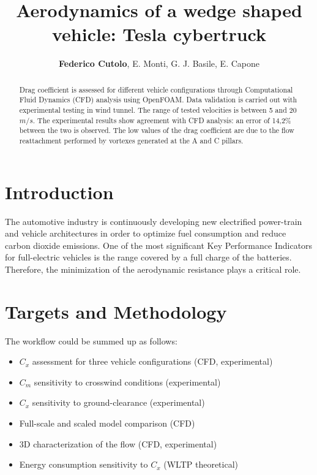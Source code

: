 \documentclass{elbioimp2}
\title{Aerodynamics of a wedge shaped vehicle: Tesla cybertruck}
\author{\textbf{Federico Cutolo}\affiliation{Department of Aerospace Science and Technology, Politecnico di Milano, Milano, Italy}, E. Monti, G. J. Basile, E. Capone\affiliation{Department of Mechanics, Politecnico di Milano, Milano, Italy}}
\begin{document}
\maketitle
\begin{abstract}
  Drag coefficient is assessed for different vehicle configurations through Computational Fluid Dynamics (CFD) analysis using OpenFOAM\textsupercript\textregistered. Data validation is carried out with experimental testing in wind tunnel. The  range of tested velocities is between 5 and 20 $m/s$. The experimental results show agreement with CFD analysis: an error of 14,2\% between the two is observed. The low values of the drag coefficient are due to the flow reattachment performed by vortexes generated at the A and C pillars.
\end{abstract}
\section{Introduction}
The automotive industry is continuously developing new electrified power-train and vehicle architectures in order to optimize fuel consumption and reduce carbon dioxide emissions.
One of the most significant Key Performance Indicators for full-electric vehicles is the range covered by a full charge of the batteries. Therefore, the minimization of the aerodynamic resistance plays a critical role. 

\section{Targets and Methodology}
The workflow could be summed up as follows:
\begin{itemize}
    \item $C_x$ assessment for three vehicle configurations (CFD, experimental)
    \item $C_m$ sensitivity to crosswind conditions (experimental)
    \item $C_x$ sensitivity to ground-clearance (experimental)
    \item Full-scale and scaled model comparison (CFD)
    \item 3D characterization of the flow (CFD, experimental)
    \item Energy consumption sensitivity to $C_x$ (WLTP theoretical)
\end{itemize}
\end{document}
